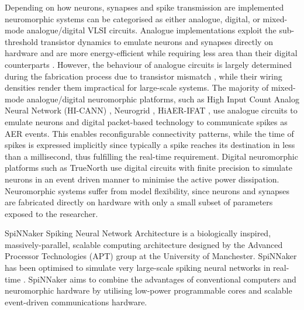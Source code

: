 Depending on how neurons, synapses and spike transmission are implemented neuromorphic systems can be categorised as either analogue, digital, or mixed-mode analogue/digital VLSI circuits. Analogue implementations exploit the sub-threshold transistor dynamics to emulate neurons and synapses directly on hardware \citep{giacom} and are more energy-efficient while requiring less area than their digital counterparts \citep{temamanalogdigital}. However, the behaviour of analogue circuits is largely determined during the fabrication process due to transistor mismatch \citep{giacom,analoguemismatch,bernabeDACsynapses}, while their wiring densities render them impractical for large-scale systems. The majority of mixed-mode analogue/digital neuromorphic platforms, such as High Input Count Analog Neural Network (HI-CANN) \citep{Schemmel_etal10}, Neurogrid \citep{benjamin2014neurogrid}, HiAER-IFAT \citep{gert}, use analogue circuits to emulate neurons and digital packet-based technology to communicate spikes as AER events. This enables reconfigurable connectivity patterns, while the time of spikes is expressed implicitly since typically a spike reaches its destination in less than a millisecond, thus fulfilling the real-time requirement. Digital neuromorphic platforms such as TrueNorth \citep{Merolla08082014} use digital circuits with finite precision to simulate neurons in an event driven manner to minimise the active power dissipation. Neuromorphic systems suffer from model flexibility, since neurons and synapses are fabricated directly on hardware with only a small subset of parameters exposed to the researcher. 

SpiNNaker Spiking Neural Network Architecture is a biologically inspired, massively-parallel, scalable computing architecture designed by the Advanced Processor Technologies (APT) group at the University of Manchester. SpiNNaker has been optimised to simulate very large-scale spiking neural networks in real-time \citep{spiNNakerProject}. SpiNNaker aims to combine the advantages of conventional computers and neuromorphic hardware by utilising low-power programmable cores and scalable event-driven communications hardware.

